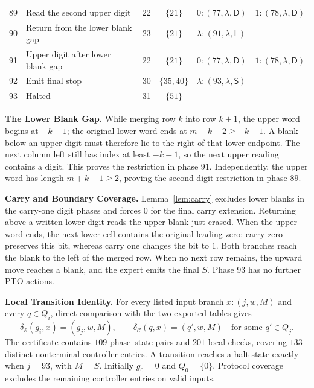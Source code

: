 \documentclass[11pt,a4paper]{article}
\newcommand{\blank}{\lambda}
\newcommand{\EXPERT}{\mathcal E}
\newcommand{\CTRL}{\mathcal C}
\newcommand{\triple}[3]{(#1,#2,\mathsf{#3})}
\begin{document}
\begin{center}
\begin{tabularx}{\textwidth}{r p{5.5cm} c c X}
89 & Read the second upper digit & 22 & $\{21\}$ & $0:\triple{77}{\blank}{D}\quad 1:\triple{78}{\blank}{D}$ \\
90 & Return from the lower blank gap & 23 & $\{21\}$ & $\blank:\triple{91}{\blank}{L}$ \\
91 & Upper digit after lower blank gap & 22 & $\{21\}$ & $0:\triple{77}{\blank}{D}\quad 1:\triple{78}{\blank}{D}$ \\
92 & Emit final stop & 30 & $\{35,40\}$ & $\blank:\triple{93}{\blank}{S}$ \\
93 & Halted & 31 & $\{51\}$ & $\text{--}$ \\
\bottomrule
\end{tabularx}
\end{center}

\textbf{The Lower Blank Gap.}
While merging row $k$ into row $k+1$, the upper word begins at $-k-1$;
the original lower word ends at $m-k-2\ge-k-1$. A blank below an upper digit
must therefore lie to the right of that lower endpoint. The next column
left still has index at least $-k-1$, so the next upper reading contains a digit.
This proves the restriction in phase $91$. Independently, the upper word
has length $m+k+1\ge2$, proving the second-digit restriction in phase $89$.

\textbf{Carry and Boundary Coverage.}
Lemma~\ref{lem:carry} excludes lower blanks in the carry-one digit phases
and forces $0$ for the final carry extension. Returning above a written
lower digit reads the upper blank just erased. When the upper word ends,
the next lower cell contains the original leading zero: carry zero
preserves this bit, whereas carry one changes the bit to $1$. Both branches reach the blank to the
left of the merged row. When no next row remains, the upward move reaches
a blank, and the expert emits the final $S$. Phase $93$ has no further PTO actions.

\textbf{Local Transition Identity.}
For every listed input branch $x:(j,w,M)$ and every $q\in Q_i$, direct
comparison with the two exported tables gives
\begin{equation}
\delta_\EXPERT(g_i,x)=(g_j,w,M),\qquad
\delta_\CTRL(q,x)=(q',w,M)\quad\text{for some }q'\in Q_j. \tag{3}
\end{equation}
The certificate contains $109$ phase--state pairs and $201$ local checks,
covering $133$ distinct nonterminal controller entries. A transition reaches
a halt state exactly when $j=93$, with $M=S$. Initially $g_0=0$ and $Q_0=\{0\}$.
Protocol coverage excludes the remaining controller entries on valid inputs.
\end{document}
